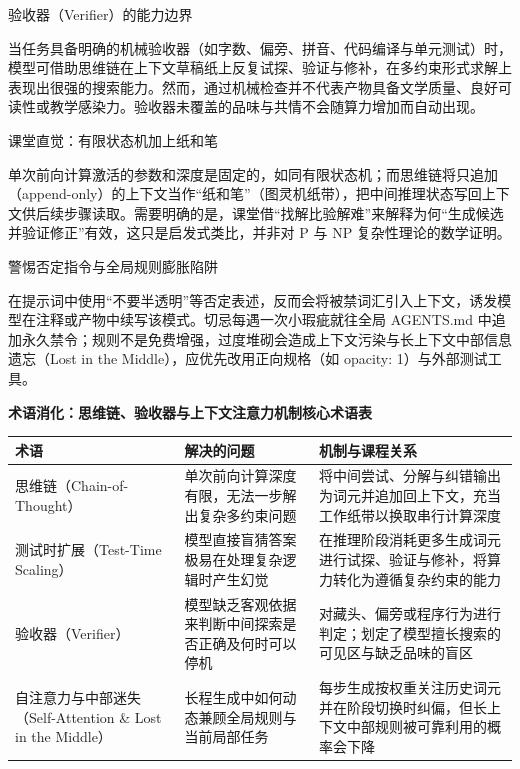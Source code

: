 \documentclass[UTF8,a4paper,11pt,fontset=fandol]{ctexart}
\begin{document}
\begin{importantbox}{验收器（Verifier）的能力边界}

当任务具备明确的机械验收器（如字数、偏旁、拼音、代码编译与单元测试）时，模型可借助思维链在上下文草稿纸上反复试探、验证与修补，在多约束形式求解上表现出很强的搜索能力。然而，通过机械检查并不代表产物具备文学质量、良好可读性或教学感染力。验收器未覆盖的品味与共情不会随算力增加而自动出现。

\end{importantbox}

\begin{knowledgebox}{课堂直觉：有限状态机加上纸和笔}

单次前向计算激活的参数和深度是固定的，如同有限状态机；而思维链将只追加（append-only）的上下文当作“纸和笔”（图灵机纸带），把中间推理状态写回上下文供后续步骤读取。需要明确的是，课堂借“找解比验解难”来解释为何“生成候选并验证修正”有效，这只是启发式类比，并非对 P 与 NP 复杂性理论的数学证明。

\end{knowledgebox}

\begin{warningbox}{警惕否定指令与全局规则膨胀陷阱}

在提示词中使用“不要半透明”等否定表述，反而会将被禁词汇引入上下文，诱发模型在注释或产物中续写该模式。切忌每遇一次小瑕疵就往全局 AGENTS.md 中追加永久禁令；规则不是免费增强，过度堆砌会造成上下文污染与长上下文中部信息遗忘（Lost in the Middle），应优先改用正向规格（如 opacity: 1）与外部测试工具。

\end{warningbox}

\par{}\textbf{术语消化：思维链、验收器与上下文注意力机制核心术语表}

\begin{center}\small\begin{tabularx}{\linewidth}{YYY}

\toprule

术语 & 解决的问题 & 机制与课程关系\\\midrule

思维链（Chain-of-Thought） & 单次前向计算深度有限，无法一步解出复杂多约束问题 & 将中间尝试、分解与纠错输出为词元并追加回上下文，充当工作纸带以换取串行计算深度\\[3pt]

测试时扩展（Test-Time Scaling） & 模型直接盲猜答案极易在处理复杂逻辑时产生幻觉 & 在推理阶段消耗更多生成词元进行试探、验证与修补，将算力转化为遵循复杂约束的能力\\[3pt]

验收器（Verifier） & 模型缺乏客观依据来判断中间探索是否正确及何时可以停机 & 对藏头、偏旁或程序行为进行判定；划定了模型擅长搜索的可见区与缺乏品味的盲区\\[3pt]

自注意力与中部迷失（Self-Attention \& Lost in the Middle） & 长程生成中如何动态兼顾全局规则与当前局部任务 & 每步生成按权重关注历史词元并在阶段切换时纠偏，但长上下文中部规则被可靠利用的概率会下降\\[3pt]

\bottomrule\end{tabularx}\end{center}
\end{document}
